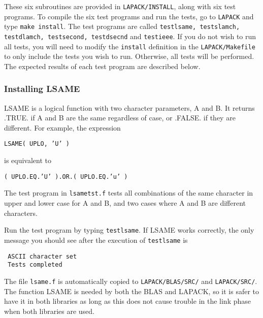 These six subroutines are provided in {\tt LAPACK/INSTALL},
along with six test programs.
To compile the six test programs and run the tests, go to {\tt LAPACK} and
type {\tt make install}.  The test programs are called
{\tt testlsame, testslamch, testdlamch, testsecond, testdsecnd} and
{\tt testieee}.
If you do not wish to run all tests, you will need to modify the 
{\tt install} definition in the {\tt LAPACK/Makefile} to only include the
tests you wish to run.  Otherwise, all tests will be performed.
The expected results of each test program are described below.

\subsubsection{Installing LSAME}
\dent
LSAME is a logical function with two character parameters, A and B.
It returns .TRUE. if A and B are the same regardless of case, or .FALSE.
if they are different. 
For example, the expression

\begin{list}{}{} 
\item {\tt LSAME( UPLO, 'U' )}
\end{list}
\noindent 
is equivalent to
\begin{list}{}{} 
\item {\tt ( UPLO.EQ.'U' ).OR.( UPLO.EQ.'u' )}
\end{list} 
 
The test program in {\tt lsametst.f} tests all combinations of
the same character in upper and lower case for A and B, and two
cases where A and B are different characters.

Run the test program by typing {\tt testlsame}.
If LSAME works correctly, the only message you should see after the
execution of {\tt testlsame} is
\begin{verbatim}
 ASCII character set
 Tests completed
\end{verbatim}
The file {\tt lsame.f} is automatically copied to
{\tt LAPACK/BLAS/SRC/} and {\tt LAPACK/SRC/}. 
The function LSAME is needed by both the BLAS and LAPACK, so it is safer
to have it in both libraries as long as this does not cause trouble
in the link phase when both libraries are used.

